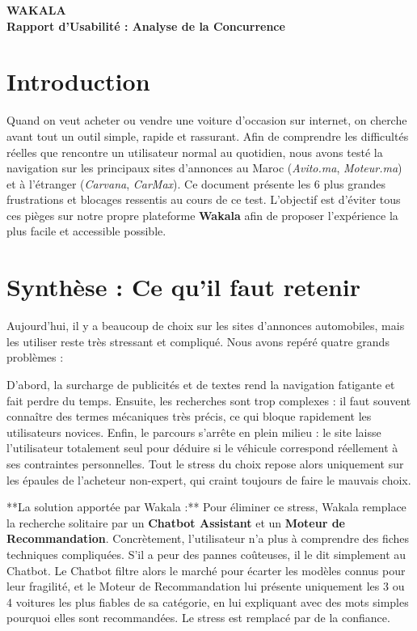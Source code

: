 \documentclass[a4paper, 11pt]{article}
\begin{document}
\begin{center}
    
    {\Huge \textcolor{primaryBlue}{\textbf{WAKALA}}}\\[0.2cm]
    {\large \bfseries \textcolor{primaryBlue}{Rapport d'Usabilité : Analyse de la Concurrence}}
\end{center}

\vspace{0.5cm}

\section*{Introduction}
Quand on veut acheter ou vendre une voiture d'occasion sur internet, on cherche avant tout un outil simple, rapide et rassurant. Afin de comprendre les difficultés réelles que rencontre un utilisateur normal au quotidien, nous avons testé la navigation sur les principaux sites d'annonces au Maroc (\textit{Avito.ma}, \textit{Moteur.ma}) et à l'étranger (\textit{Carvana}, \textit{CarMax}). Ce document présente les 6 plus grandes frustrations et blocages ressentis au cours de ce test. L'objectif est d'éviter tous ces pièges sur notre propre plateforme \textbf{Wakala} afin de proposer l'expérience la plus facile et accessible possible.

\vspace{0.3cm}


\section*{Synthèse : Ce qu'il faut retenir}
Aujourd'hui, il y a beaucoup de choix sur les sites d'annonces automobiles, mais les utiliser reste très stressant et compliqué. Nous avons repéré quatre grands problèmes :

D'abord, la surcharge de publicités et de textes rend la navigation fatigante et fait perdre du temps. Ensuite, les recherches sont trop complexes : il faut souvent connaître des termes mécaniques très précis, ce qui bloque rapidement les utilisateurs novices. Enfin, le parcours s'arrête en plein milieu : le site laisse l'utilisateur totalement seul pour déduire si le véhicule correspond réellement à ses contraintes personnelles. Tout le stress du choix repose alors uniquement sur les épaules de l'acheteur non-expert, qui craint toujours de faire le mauvais choix.

**La solution apportée par Wakala :** Pour éliminer ce stress, Wakala remplace la recherche solitaire par un \textbf{Chatbot Assistant} et un \textbf{Moteur de Recommandation}. 
Concrètement, l'utilisateur n'a plus à comprendre des fiches techniques compliquées. S'il a peur des pannes coûteuses, il le dit simplement au Chatbot. Le Chatbot filtre alors le marché pour écarter les modèles connus pour leur fragilité, et le Moteur de Recommandation lui présente uniquement les 3 ou 4 voitures les plus fiables de sa catégorie, en lui expliquant avec des mots simples pourquoi elles sont recommandées. Le stress est remplacé par de la confiance.
\end{document}

